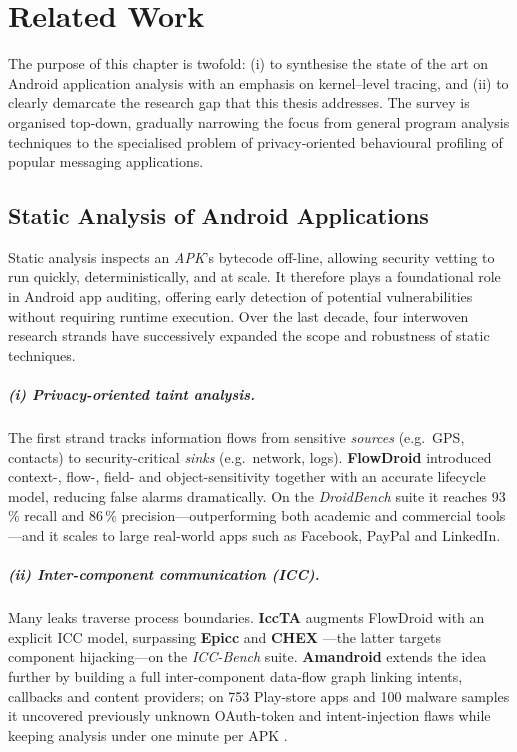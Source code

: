 \documentclass[a4paper,12pt]{report}
\begin{document}
\chapter{Related Work}\label{ch:related}

The purpose of this chapter is twofold: (i) to synthesise the state of the art on Android
application analysis with an emphasis on kernel–level tracing, and (ii) to
clearly demarcate the research gap that this thesis addresses.  The survey is
organised top‑down, gradually narrowing the focus from general program analysis
techniques to the specialised problem of privacy‑oriented behavioural
profiling of popular messaging applications.

\section{Static Analysis of Android Applications}
\label{sec:rw:static}

Static analysis inspects an \emph{APK}'s bytecode off-line, allowing security vetting to run quickly, deterministically, and at scale. It therefore plays a foundational role in Android app auditing, offering early detection of potential vulnerabilities without requiring runtime execution.  Over the last decade, four interwoven research strands have successively expanded the scope and robustness of static techniques.

\paragraph{(i) Privacy-oriented taint analysis.}
The first strand tracks information flows from sensitive \emph{sources} (e.g.\ GPS, contacts) to security-critical \emph{sinks} (e.g.\ network, logs).  \textbf{FlowDroid} introduced context-, flow-, field- and object-sensitivity together with an accurate lifecycle model, reducing false alarms dramatically.  On the \emph{DroidBench} suite it reaches 93\,\% recall and 86\,\% precision—outperforming both academic and commercial tools \cite{arzt2014flowdroid}—and it scales to large real-world apps such as Facebook, PayPal and LinkedIn.

\paragraph{(ii) Inter-component communication (ICC).}
Many leaks traverse process boundaries.  \textbf{IccTA} augments FlowDroid with an explicit ICC model, surpassing \textbf{Epicc} \cite{octeau2013epicc} and \textbf{CHEX} \cite{lu2012chex}—the latter targets component hijacking—on the \emph{ICC-Bench} suite.  \textbf{Amandroid} extends the idea further by building a full inter-component data-flow graph linking intents, callbacks and content providers; on 753 Play-store apps and 100 malware samples it uncovered previously unknown OAuth-token and intent-injection flaws while keeping analysis under one minute per APK \cite{wei2014amandroid}.
\end{document}
